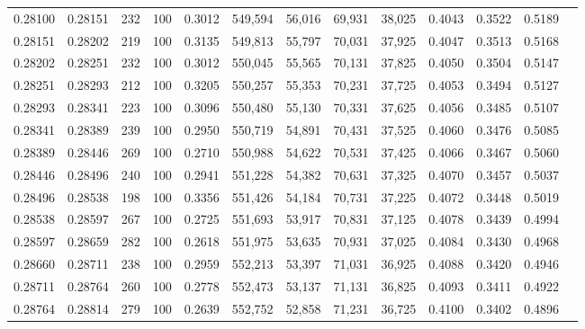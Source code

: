 \begin{tabular}{rrrrrrrrrrrrr}
0.28100 & 0.28151 &   232 & 100 &                                     0.3012 & 549,594 &  56,016 &  69,931 &  38,025 & 0.4043 & 0.3522 & 0.5189 \\
0.28151 & 0.28202 &   219 & 100 &                                     0.3135 & 549,813 &  55,797 &  70,031 &  37,925 & 0.4047 & 0.3513 & 0.5168 \\
0.28202 & 0.28251 &   232 & 100 &                                     0.3012 & 550,045 &  55,565 &  70,131 &  37,825 & 0.4050 & 0.3504 & 0.5147 \\
0.28251 & 0.28293 &   212 & 100 &                                     0.3205 & 550,257 &  55,353 &  70,231 &  37,725 & 0.4053 & 0.3494 & 0.5127 \\
0.28293 & 0.28341 &   223 & 100 &                                     0.3096 & 550,480 &  55,130 &  70,331 &  37,625 & 0.4056 & 0.3485 & 0.5107 \\
0.28341 & 0.28389 &   239 & 100 &                                     0.2950 & 550,719 &  54,891 &  70,431 &  37,525 & 0.4060 & 0.3476 & 0.5085 \\
0.28389 & 0.28446 &   269 & 100 &                                     0.2710 & 550,988 &  54,622 &  70,531 &  37,425 & 0.4066 & 0.3467 & 0.5060 \\
0.28446 & 0.28496 &   240 & 100 &                                     0.2941 & 551,228 &  54,382 &  70,631 &  37,325 & 0.4070 & 0.3457 & 0.5037 \\
0.28496 & 0.28538 &   198 & 100 &                                     0.3356 & 551,426 &  54,184 &  70,731 &  37,225 & 0.4072 & 0.3448 & 0.5019 \\
0.28538 & 0.28597 &   267 & 100 &                                     0.2725 & 551,693 &  53,917 &  70,831 &  37,125 & 0.4078 & 0.3439 & 0.4994 \\
0.28597 & 0.28659 &   282 & 100 &                                     0.2618 & 551,975 &  53,635 &  70,931 &  37,025 & 0.4084 & 0.3430 & 0.4968 \\
0.28660 & 0.28711 &   238 & 100 &                                     0.2959 & 552,213 &  53,397 &  71,031 &  36,925 & 0.4088 & 0.3420 & 0.4946 \\
0.28711 & 0.28764 &   260 & 100 &                                     0.2778 & 552,473 &  53,137 &  71,131 &  36,825 & 0.4093 & 0.3411 & 0.4922 \\
0.28764 & 0.28814 &   279 & 100 &                                     0.2639 & 552,752 &  52,858 &  71,231 &  36,725 & 0.4100 & 0.3402 & 0.4896 \\

\end{tabular}
